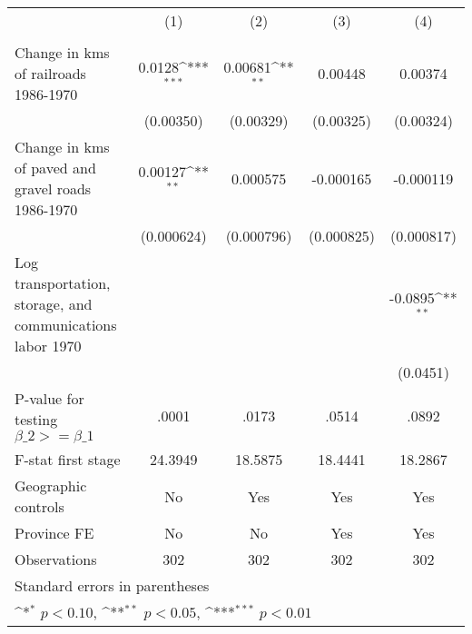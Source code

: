 {
\def\sym#1{\ifmmode^{#1}\else\(^{#1}\)\fi}
\begin{tabular}{l*{4}{c}}
\hline\hline
                &\multicolumn{1}{c}{(1)}&\multicolumn{1}{c}{(2)}&\multicolumn{1}{c}{(3)}&\multicolumn{1}{c}{(4)}\\
                &\multicolumn{1}{c}{}&\multicolumn{1}{c}{}&\multicolumn{1}{c}{}&\multicolumn{1}{c}{}\\
\hline
Change in kms of railroads 1986-1970&   0.0128\sym{***}&  0.00681\sym{**} &  0.00448         &  0.00374         \\
                &(0.00350)         &(0.00329)         &(0.00325)         &(0.00324)         \\
[1em]
Change in kms of paved and gravel roads 1986-1970&  0.00127\sym{**} & 0.000575         &-0.000165         &-0.000119         \\
                &(0.000624)         &(0.000796)         &(0.000825)         &(0.000817)         \\
[1em]
Log transportation, storage, and communications labor 1970&                  &                  &                  &  -0.0895\sym{**} \\
                &                  &                  &                  & (0.0451)         \\
\hline
P-value for testing $\beta\_{2} >= \beta\_{1}$&    .0001         &    .0173         &    .0514         &    .0892         \\
F-stat first stage&  24.3949         &  18.5875         &  18.4441         &  18.2867         \\
Geographic controls&       No         &      Yes         &      Yes         &      Yes         \\
Province FE     &       No         &       No         &      Yes         &      Yes         \\
Observations    &      302         &      302         &      302         &      302         \\
\hline\hline
\multicolumn{5}{l}{\footnotesize Standard errors in parentheses}\\
\multicolumn{5}{l}{\footnotesize \sym{*} \(p<0.10\), \sym{**} \(p<0.05\), \sym{***} \(p<0.01\)}\\
\end{tabular}
}
